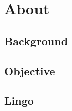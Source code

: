 \section{About}

\subsection{Background}
\frameready{
	
}

\subsection{Objective}
\frameready{
	
}

\subsection{Lingo}
\frameready{
	
	
}